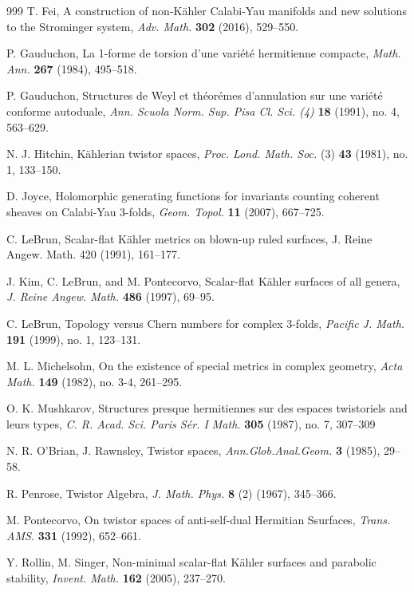 \documentclass[11pt]{amsart}
\theoremstyle{definition}
\theoremstyle{plain}
\theoremstyle{definition}
\theoremstyle{plain}
\theoremstyle{remark}
\theoremstyle{plain}
\begin{document}
\begin{thebibliography}{999}
 T. Fei,  A construction of non-K\"ahler Calabi-Yau manifolds and new solutions to the Strominger system, 
\emph{Adv. Math.}  \textbf{302} (2016), 529--550.

  P. Gauduchon,  La 1-forme de torsion d’une vari\'et\'e  hermitienne compacte,
\emph{Math. Ann.}  \textbf{267} (1984), 495--518.

 P. Gauduchon, Structures de Weyl et th\'eor\'emes d'annulation sur une vari\'et\'e conforme autoduale,
\emph{Ann. Scuola Norm. Sup. Pisa Cl. Sci. (4)}  \textbf{18} (1991), no. 4, 563--629.


 N. J. Hitchin, K\"ahlerian twistor spaces, \emph{Proc. Lond. Math. Soc.} (3) \textbf{43} (1981), no. 1, 133–150.

 D. Joyce, Holomorphic generating functions for invariants counting coherent sheaves on Calabi-Yau 3-folds, 
\emph{Geom. Topol.} \textbf{11} (2007), 667--725.

  C. LeBrun, Scalar-flat K\"ahler metrics on blown-up ruled surfaces, J. Reine Angew. Math. 420
 (1991), 161–177.

 J.  Kim, C.  LeBrun, and M.  Pontecorvo, Scalar-flat K\"ahler surfaces of all genera,
\emph{J. Reine Angew. Math.}  \textbf{486} (1997),  69--95.

  C. LeBrun, 
Topology versus Chern numbers for complex $3$-folds,  \emph{Pacific J. Math.}  \textbf{191} (1999), no. 1, 123--131.

 M. L. Michelsohn, On the existence of special metrics in complex geometry,  \emph{Acta Math.}  \textbf{149} (1982), no. 3-4,
261--295.

 O. K. Mushkarov, Structures presque hermitiennes sur des espaces twistoriels and leurs types, \emph{C. R. Acad. Sci. Paris Sér. I Math.}  \textbf{305}  (1987), no. 7, 307–309

  N. R. O’Brian,  J.  Rawnsley, Twistor spaces,  \emph{Ann.Glob.Anal.Geom.}  \textbf{3} (1985), 29--58.

 R. Penrose, Twistor Algebra, \emph{J.  Math.  Phys.}  \textbf{8} (2) (1967), 345–366.


 M. Pontecorvo,  On  twistor  spaces of  anti-self-dual
Hermitian Ssurfaces, \emph{Trans. AMS.}  \textbf{331} (1992), 652--661.

 Y. Rollin, M. Singer, Non-minimal scalar-flat K\"ahler surfaces and parabolic stability, \emph{Invent. Math.} \textbf{162} (2005), 237--270.


\end{thebibliography}
\end{document}
